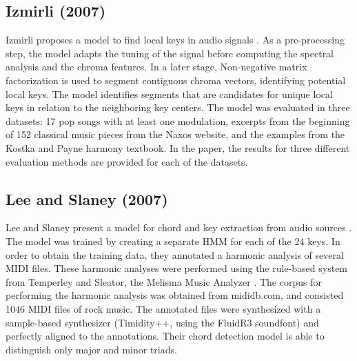 \subsection{Izmirli (2007)}

Izmirli proposes a model to find local keys in audio signals \cite{izmirli_localized_2007}. As a pre-processing step, the model adapts the tuning of the signal before computing the spectral analysis and the chroma features. In a later stage, Non-negative matrix factorization is used to segment contiguous chroma vectors, identifying potential local keys. The model identifies segments that are candidates for unique local keys in relation to the neighboring key centers. The model was evaluated in three datasets: 17 pop songs with at least one modulation, excerpts from the beginning of 152 classical music pieces from the Naxos website, and the examples from the Kostka and Payne harmony textbook. In the paper, the results for three different evaluation methods are provided for each of the datasets.

\subsection{Lee and Slaney (2007)}
Lee and Slaney present a model for chord and key extraction from audio sources \cite{lee_unified_2007}. The model was trained by creating a separate HMM for each of the 24 keys. In order to obtain the training data, they annotated a harmonic analysis of several MIDI files. These harmonic analyses were performed using the rule-based system from Temperley and Sleator, the Melisma Music Analyzer \cite{temperley_cognition_2004}. The corpus for performing the harmonic analysis was obtained from mididb.com, and consisted 1046 MIDI files of rock music. The annotated files were synthesized with a sample-based synthesizer (Timidity++, using the FluidR3 soundfont) and perfectly aligned to the annotations. Their chord detection model is able to distinguish only major and minor triads.



